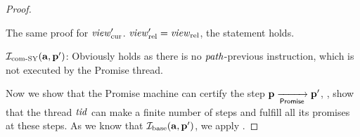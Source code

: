 \begin{proof}
\begin{itemize}
  The same proof for $\mathit{view}_{\mathrm{cur}}'$. $\mathit{view}_{\mathrm{rel}}' = \mathit{view}_{\mathrm{rel}}$, the statement holds.

  $\mathcal{I}_{\textup{\rm com-SY}}(\mathbf{a}, \mathbf{p}')$: Obviously holds as there is no $\mathit{path}$-previous instruction, which is not executed by the Promise thread.
  \end{itemize}

Now we show that the Promise machine can certify the step $\mathbf{p} \xrightarrow[\mathsf{Promise}]{} \mathbf{p}'$,
\ie, show that the thread $\mathit{tid}$ can make a finite number of steps
and fulfill all its promises at these steps.
As we know that $\mathcal{I}_{\textup{\rm base}}(\mathbf{a}, \mathbf{p}')$, we apply \app{\ref{cert-thm}}.




\end{proof}
